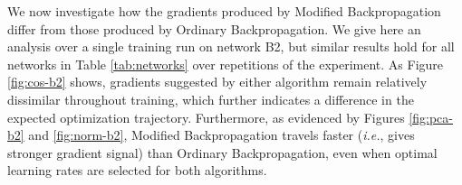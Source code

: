 \documentclass{article}
\theoremstyle{plain}
\theoremstyle{definition}
\theoremstyle{remark}
\begin{document}
We now investigate how the gradients produced by Modified Backpropagation differ from those produced by Ordinary Backpropagation. We give here an analysis over a single training run on network B2, but similar results hold for all networks in Table \ref{tab:networks} over repetitions of the experiment. As Figure \ref{fig:cos-b2} shows, gradients suggested by either algorithm remain relatively dissimilar throughout training, which further indicates a difference in the expected optimization trajectory. Furthermore, as evidenced by Figures \ref{fig:pca-b2} and \ref{fig:norm-b2}, Modified Backpropagation travels faster (\textit{i.e.}, gives stronger gradient signal) than Ordinary Backpropagation, even when optimal learning rates are selected for both algorithms.

\end{document}
